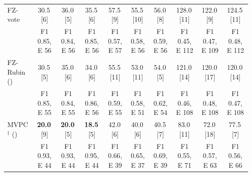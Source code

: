 \begin{tabular}{lccccccccc}
    FZ-vote                                       & 30.5\,{\scriptsize[6]} & 36.0\,{\scriptsize[5]} & 35.5\,{\scriptsize[6]} & 57.5\,{\scriptsize[9]} & 55.5\,{\scriptsize[10]} & 56.0\,{\scriptsize[8]} & 128.0\,{\scriptsize[11]} & 122.0\,{\scriptsize[9]} & 124.5\,{\scriptsize[11]} \\
                                                  & {\scriptsize F1 0.85, E 56} & {\scriptsize F1 0.84, E 56} & {\scriptsize F1 0.85, E 56} & {\scriptsize F1 0.57, E 57} & {\scriptsize F1 0.58, E 56} & {\scriptsize F1 0.59, E 56} & {\scriptsize F1 0.45, E 112} & {\scriptsize F1 0.47, E 109} & {\scriptsize F1 0.48, E 112} \\
    FZ-Rubin (\citeauthor{witte2022multiple})     & 30.5\,{\scriptsize[5]} & 35.0\,{\scriptsize[6]} & 34.0\,{\scriptsize[6]} & 55.5\,{\scriptsize[11]} & 53.0\,{\scriptsize[11]} & 54.0\,{\scriptsize[5]} & 121.0\,{\scriptsize[14]} & 120.0\,{\scriptsize[17]} & 120.0\,{\scriptsize[14]} \\
                                                  & {\scriptsize F1 0.85, E 55} & {\scriptsize F1 0.84, E 55} & {\scriptsize F1 0.86, E 56} & {\scriptsize F1 0.59, E 55} & {\scriptsize F1 0.58, E 51} & {\scriptsize F1 0.62, E 54} & {\scriptsize F1 0.46, E 108} & {\scriptsize F1 0.48, E 108} & {\scriptsize F1 0.47, E 108} \\
    MVPC$^\ddagger$ (\citeauthor{tu2019causal})   & \textbf{20.0}\,{\scriptsize[9]} & \textbf{20.0}\,{\scriptsize[5]} & \textbf{18.5}\,{\scriptsize[5]} & 42.0\,{\scriptsize[6]} & 40.0\,{\scriptsize[6]} & 40.5\,{\scriptsize[7]} & 83.0\,{\scriptsize[11]} & 72.0\,{\scriptsize[18]} & 77.5\,{\scriptsize[7]} \\
                                                  & {\scriptsize F1 0.93, E 44} & {\scriptsize F1 0.93, E 44} & {\scriptsize F1 0.95, E 44} & {\scriptsize F1 0.66, E 39} & {\scriptsize F1 0.65, E 37} & {\scriptsize F1 0.69, E 39} & {\scriptsize F1 0.55, E 71} & {\scriptsize F1 0.57, E 63} & {\scriptsize F1 0.56, E 66} \\
    \bottomrule
\end{tabular}
